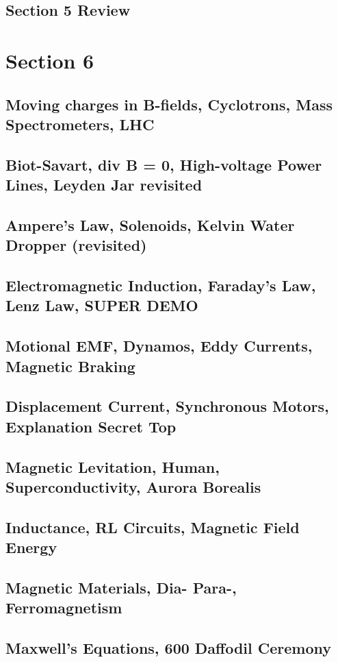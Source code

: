 \documentclass[../introphysics.tex]{subfiles}
\begin{document}
\section{Section 5 Review}
\chapter{Section 6}
\section{Moving charges in B-fields, Cyclotrons, Mass Spectrometers, LHC}
\section{Biot-Savart, div B = 0, High-voltage Power Lines, Leyden Jar revisited}
\section{Ampere's Law, Solenoids, Kelvin Water Dropper (revisited)}
\section{Electromagnetic Induction, Faraday's Law, Lenz Law, SUPER DEMO}
\section{Motional EMF, Dynamos, Eddy Currents, Magnetic Braking}
\section{Displacement Current, Synchronous Motors, Explanation Secret Top}
\section{Magnetic Levitation, Human, Superconductivity, Aurora Borealis}
\section{Inductance, RL Circuits, Magnetic Field Energy}
\section{Magnetic Materials, Dia- Para-, Ferromagnetism}
\section{Maxwell's Equations, 600 Daffodil Ceremony}
\end{document}
